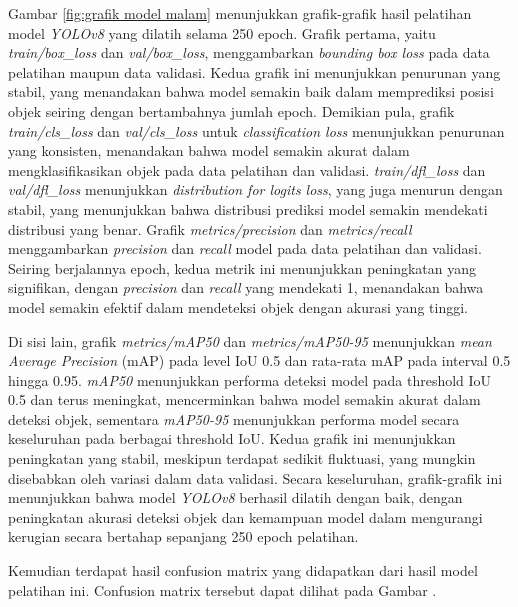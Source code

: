 Gambar \ref{fig:grafik model malam} menunjukkan grafik-grafik hasil pelatihan model \emph{YOLOv8} yang dilatih selama 250 epoch. Grafik pertama, yaitu \emph{train/box\_loss} dan \emph{val/box\_loss}, menggambarkan \emph{bounding box loss} pada data pelatihan maupun data validasi. Kedua grafik ini menunjukkan penurunan yang stabil, yang menandakan bahwa model semakin baik dalam memprediksi posisi objek seiring dengan bertambahnya jumlah epoch. Demikian pula, grafik \emph{train/cls\_loss} dan \emph{val/cls\_loss} untuk \emph{classification loss} menunjukkan penurunan yang konsisten, menandakan bahwa model semakin akurat dalam mengklasifikasikan objek pada data pelatihan dan validasi. \emph{train/dfl\_loss} dan \emph{val/dfl\_loss} menunjukkan \emph{distribution for logits loss}, yang juga menurun dengan stabil, yang menunjukkan bahwa distribusi prediksi model semakin mendekati distribusi yang benar. Grafik \emph{metrics/precision} dan \emph{metrics/recall} menggambarkan \emph{precision} dan \emph{recall} model pada data pelatihan dan validasi. Seiring berjalannya epoch, kedua metrik ini menunjukkan peningkatan yang signifikan, dengan \emph{precision} dan \emph{recall} yang mendekati 1, menandakan bahwa model semakin efektif dalam mendeteksi objek dengan akurasi yang tinggi.

Di sisi lain, grafik \emph{metrics/mAP50} dan \emph{metrics/mAP50-95} menunjukkan \emph{mean Average Precision} (mAP) pada level IoU 0.5 dan rata-rata mAP pada interval 0.5 hingga 0.95. \emph{mAP50} menunjukkan performa deteksi model pada threshold IoU 0.5 dan terus meningkat, mencerminkan bahwa model semakin akurat dalam deteksi objek, sementara \emph{mAP50-95} menunjukkan performa model secara keseluruhan pada berbagai threshold IoU. Kedua grafik ini menunjukkan peningkatan yang stabil, meskipun terdapat sedikit fluktuasi, yang mungkin disebabkan oleh variasi dalam data validasi. Secara keseluruhan, grafik-grafik ini menunjukkan bahwa model \emph{YOLOv8} berhasil dilatih dengan baik, dengan peningkatan akurasi deteksi objek dan kemampuan model dalam mengurangi kerugian secara bertahap sepanjang 250 epoch pelatihan.

Kemudian terdapat hasil confusion matrix yang didapatkan dari hasil model pelatihan ini. Confusion matrix tersebut dapat dilihat pada Gambar .

